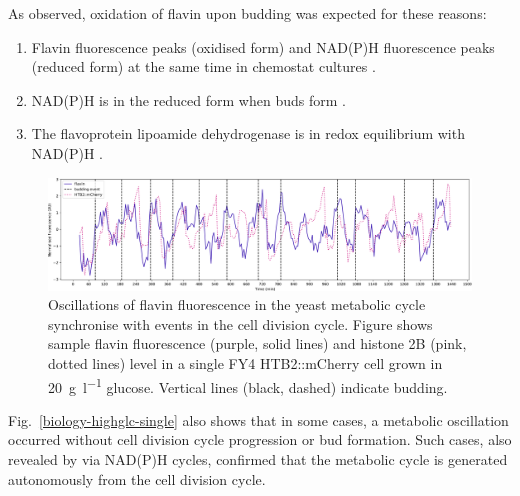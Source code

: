 As observed, oxidation of flavin upon budding was expected for these reasons:
\begin{enumerate}
  \item Flavin fluorescence peaks (oxidised form) and NAD(P)H fluorescence peaks (reduced form) at the same time in chemostat cultures \parencite{murrayRedoxRegulationRespiring2011}.
  \item NAD(P)H is in the reduced form when buds form \parencite{papagiannakisAutonomousMetabolicOscillations2017}.
  \item The flavoprotein lipoamide dehydrogenase is in redox equilibrium with NAD(P)H \parencite{sianoNADHFlavinFluorescence1989}.
\end{enumerate}

\begin{figure}
  \centering
    \includegraphics[width=1.0\linewidth]{single_birth_plot_edit.pdf}
    \caption{
      Oscillations of flavin fluorescence in the yeast metabolic cycle synchronise with events in the cell division cycle.
      Figure shows sample flavin fluorescence (purple, solid lines) and histone 2B (pink, dotted lines) level in a single FY4 HTB2::mCherry cell grown in \SI{20}{\gram~\litre^{-1}} glucose.
      Vertical lines (black, dashed) indicate budding.
    }
  \label{fig:biology-highglc-single}
\end{figure}

Fig.\ \ref{biology-highglc-single} also shows that in some cases, a metabolic oscillation occurred without cell division cycle progression or bud formation.
Such cases, also revealed by \textcite{papagiannakisAutonomousMetabolicOscillations2017} via NAD(P)H cycles, confirmed that the metabolic cycle is generated autonomously from the cell division cycle.



